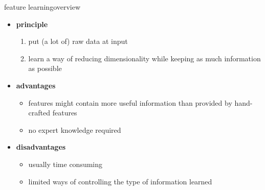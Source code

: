         \begin{frame}{feature learning}{overview}
            \begin{itemize}
                \item   \textbf{principle}
                    \begin{enumerate}
                        \item   put (a lot of) raw data at input
                        \item   learn a way of reducing dimensionality while keeping as much information as possible
                    \end{enumerate}
                \bigskip
                \item<2->   \textbf{advantages}
                    \begin{itemize}
                        \item   features might contain more useful information than provided by hand-crafted features
                        \item   no expert knowledge required
                    \end{itemize}
                \smallskip
                \item<3->   \textbf{disadvantages}
                    \begin{itemize}
                        \item   usually time consuming
                        \item   limited ways of controlling the type of information learned
                    \end{itemize}
            \end{itemize}
		\end{frame}
